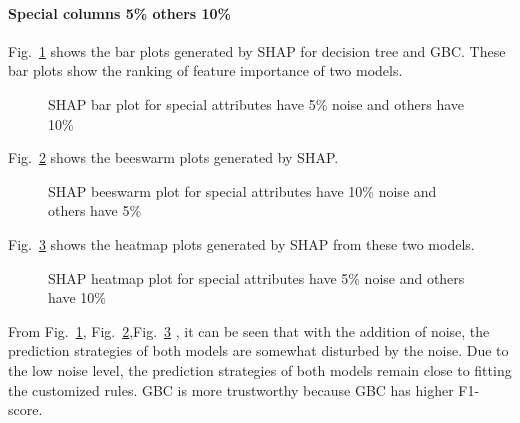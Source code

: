 \documentclass[runningheads,a4paper]{llncs}
\begin{document}
\paragraph{Special columns 5\% others 10\%}
Fig.~\ref{bar plots special_lower 10} shows the bar plots generated by SHAP for decision tree and GBC. These bar plots show the ranking of feature importance of two models.
\begin{figure}[H]
	\centering
	
	\hfill
	
	
	\caption{SHAP bar plot for special attributes have 5\% noise and others have 10\% }
	\label{bar plots special_lower 10}
\end{figure}
Fig.~\ref{bee plots special_lower 10} shows the beeswarm plots generated by SHAP.
\begin{figure}[H]
	\centering
	
	\hfill
	
	
	\caption{SHAP beeswarm plot for special attributes have 10\% noise and others have 5\% }
	\label{bee plots special_lower 10}
	
\end{figure}
Fig.~\ref{heat plots special_lower 10} shows the heatmap plots generated by SHAP from these two models.
\begin{figure}[H]
	\centering
	
	\hfill
	
	
	\caption{SHAP heatmap plot for special attributes have 5\% noise and others have 10\%}
	\label{heat plots special_lower 10}
	
\end{figure}

From Fig.~\ref{bar plots special_lower 10}, Fig.~\ref{bee plots special_lower 10},Fig.~\ref{heat plots special_lower 10} , it can be seen that with the addition of noise, the prediction strategies of both models are somewhat disturbed by the noise. Due to the low noise level, the prediction strategies of both models remain close to fitting the customized rules. GBC is more trustworthy because GBC has higher F1-score.
\end{document}
